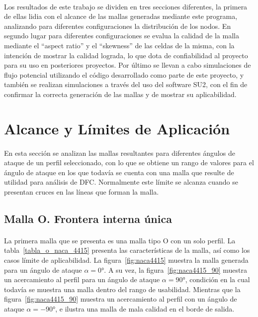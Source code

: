\documentclass[letterpaper, openright, 12pt]{book}
\begin{document}
    \paragraph*{}
    Los resultados de este trabajo se dividen en tres secciones diferentes,
    la primera de ellas lidia con el alcance de las mallas generadas
    mediante este programa, analizando para diferentes configuraciones la
    distribución de los nodos. En segundo lugar para diferentes
    configuraciones se evalua la calidad de la malla mediante el
    ``aspect ratio'' y el ``skewness'' de las celdas de la misma, con la
    intención de mostrar la calidad lograda, lo que dota de
    confiabilidad al proyecto para su uso en posteriores proyectos.
    Por último se llevan a cabo simulaciones de flujo potencial utilizando
    el código desarrollado como parte de este proyecto, y también se
    realizan simulaciones a través del uso del software SU2, con el fin de
    confirmar la correcta generación de las mallas y de mostrar su
    aplicabilidad.

    \section{Alcance y Límites de Aplicación}
    \paragraph*{}
    En esta sección se analizan las mallas resultantes para diferentes
    ángulos de ataque de un perfil seleccionado, con lo que se obtiene un
    rango de valores para el ángulo de ataque en los que todavía se cuenta
    con una malla que resulte de utilidad para análisis de DFC\@. Normalmente
    este límite se alcanza cuando se presentan cruces en las líneas que
    forman la malla.

    \subsection{Malla O. Frontera interna única}
    \paragraph*{}
    La primera malla que se presenta es una malla tipo O con un solo perfil.
    La tabla~\ref{tabla_o_naca_4415} presenta las características de la
    malla, así como los casos límite de aplicabilidad. La
    figura~\ref{fig:naca4415} muestra la malla generada para un ángulo de ataque
    $\alpha = 0 \si{\degree}$. A su vez, la figura~\ref{fig:naca4415_90}
    muestra un acercamiento al perfil para un ángulo de ataque
    $\alpha = 90\si{\degree}$, condición en la cual todavía se muestra una
    malla dentro del rango de usabilidad. Mientras que la
    figura~\ref{fig:naca4415_90} muestra un acercamiento al perfil con un
    ángulo de ataque $\alpha = -90\si{\degree}$, e ilustra una malla de mala
    calidad en el borde de salida.
\end{document}
